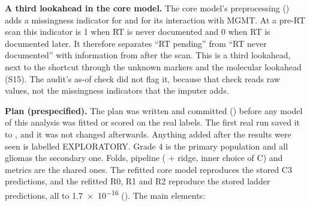 \documentclass[11pt,a4paper]{article}
\begin{document}
\textbf{A third lookahead in the core model.} The core model's preprocessing () adds a missingness
indicator for  and for its interaction with MGMT. At a pre-RT scan this indicator is 1 when RT is
never documented and 0 when RT is documented later. It therefore separates ``RT pending'' from ``RT never documented''
with information from after the scan. This is a third lookahead, next to the shortcut through the unknown markers and the
molecular lookahead (S15). The audit's as-of check did not flag it, because that check reads raw values, not the
missingness indicators that the imputer adds.

\textbf{Plan (prespecified).} The plan was written and committed () before any model of this analysis
was fitted or scored on the real labels. The first real run saved it to , and it was not
changed afterwards. Anything added after the results were seen is labelled EXPLORATORY. Grade 4 is the primary
population and all gliomas the secondary one. Folds, pipeline ( + ridge, inner choice of C) and
metrics are the shared ones. The refitted core model reproduces the stored C3 predictions, and the refitted R0, R1
and R2 reproduce the stored ladder predictions, all to \num{1.7e-16} (). The main elements:
\end{document}
